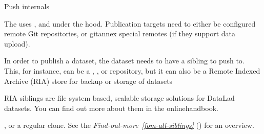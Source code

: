 \ignorespaces \begin{gitusernote}[label={index-1}, before title={\thetcbcounter\ }, check odd page=true]{Push internals}
\label{\detokenize{basics/101-141-push:index-1}}

\sphinxAtStartPar
The  uses , and  under
the hood. Publication targets need to either be configured remote Git repositories,
or git\sphinxhyphen{}annex special remotes (if they support data upload).


\end{gitusernote}

\sphinxAtStartPar
In order to publish a dataset, the dataset needs to have a sibling to push to.
This, for instance, can be a {\hyperref[\detokenize{glossary:term-GitHub}]{}}, {\hyperref[\detokenize{glossary:term-GitLab}]{}}, or {\hyperref[\detokenize{glossary:term-GIN}]{}}
repository, but it can also be a Remote Indexed Archive (RIA) store for backup
or storage of datasets%
\begin{footnote}\sphinxAtStartFootnote
RIA siblings are file system based, scalable storage solutions for
DataLad datasets. You can find out more about them in the online\sphinxhyphen{}handbook.
%
\end{footnote}, or a regular clone.
See the \textit{Find-out-more}~{\findoutmoreiconinline}\textit{\ref{fom-all-siblings}} {\hyperref[\detokenize{basics/101-141-push:fom-all-siblings}]{}} () for an overview.

